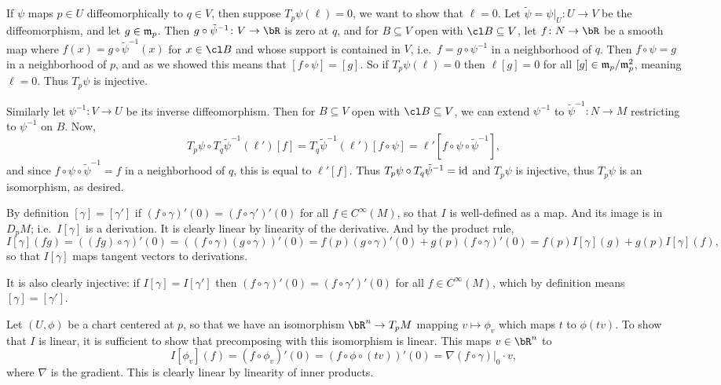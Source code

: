     If $\psi$ maps $p\in U$ diffeomorphically to $q\in V$, then suppose $T_p\psi(\ell)=0$, we want to show that
    $\ell=0$.
    Let $\tilde\psi=\psi|_U\colon U\to V$ be the diffeomorphism, and let $g\in{\frak m}_p$.
    Then $g\circ\tilde\psi^{-1}\colon V\to\bR$ is zero at $q$, and for $B\subseteq V$ open with $\cl B\subseteq V$,
    let $f\colon N\to\bR$ be a smooth map where $f(x)=g\circ\tilde\psi^{-1}(x)$ for $x\in\cl B$ and whose support is
    contained in $V$, i.e.\ $f=g\circ\psi^{-1}$ in a neighborhood of $q$.
    Then $f\circ\psi=g$ in a neighborhood of $p$, and as we showed this means that $[f\circ\psi]=[g]$.
    So if $T_p\psi(\ell)=0$ then $\ell[g]=0$ for all $[g]\in{\frak m}_p/{\frak m}_p^2$, meaning $\ell=0$.
    Thus $T_p\psi$ is injective.

    Similarly let $\psi^{-1}\colon V\to U$ be its inverse diffeomorphism.
    Then for $B\subseteq V$ open with $\cl B\subseteq V$, we can extend $\psi^{-1}$ to $\tilde\psi^{-1}\colon N\to M$
    restricting to $\psi^{-1}$ on $B$.
    Now,
    $$ T_p\psi\circ T_q{\tilde\psi^{-1}}(\ell')[f] = T_q{\tilde\psi^{-1}}(\ell')[f\circ\psi] =
    \ell'[f\circ\psi\circ\tilde\psi^{-1}] , $$
    and since $f\circ\psi\circ\tilde\psi^{-1}=f$ in a neighborhood of $q$, this is equal to $\ell'[f]$.
    Thus $T_p\psi\circ T_q\tilde\psi^{-1}={\rm id}$ and $T_p\psi$ is injective, thus $T_p\psi$ is an isomorphism, as desired.

    \item By definition $[\gamma]=[\gamma']$ if $(f\circ\gamma)'(0)=(f\circ\gamma')'(0)$ for all $f\in C^\infty(M)$,
    so that $I$ is well-defined as a map.
    And its image is in $D_pM$; i.e.\ $I[\gamma]$ is a derivation.
    It is clearly linear by linearity of the derivative.
    And by the product rule,
    $$ I[\gamma](fg) = ((fg)\circ\gamma)'(0) = ((f\circ\gamma)(g\circ\gamma))'(0) =
    f(p)(g\circ\gamma)'(0) + g(p)(f\circ\gamma)'(0) = f(p)I[\gamma](g) + g(p)I[\gamma](f) , $$
    so that $I[\gamma]$ maps tangent vectors to derivations.

    It is also clearly injective: if $I[\gamma]=I[\gamma']$ then $(f\circ\gamma)'(0)=(f\circ\gamma')'(0)$ for all
    $f\in C^\infty(M)$, which by definition means $[\gamma]=[\gamma']$.

    Let $(U,\phi)$ be a chart centered at $p$, so that we have an isomorphism $\bR^n\to T_pM$ mapping
    $v\mapsto\phi_v$ which maps $t$ to $\phi(tv)$.
    To show that $I$ is linear, it is sufficient to show that precomposing with this isomorphism is linear.
    This maps $v\in\bR^n$ to
    $$ I[\phi_v](f) = (f\circ\phi_v)'(0) = (f\circ\phi\circ(tv))'(0) = \nabla(f\circ\gamma)|_0\cdot v , $$
    where $\nabla$ is the gradient. 
    This is clearly linear by linearity of inner products.

